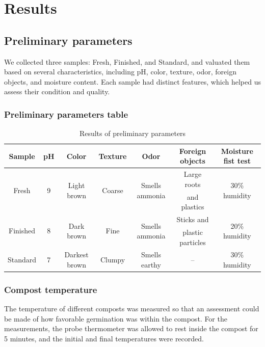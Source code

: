 \documentclass{article}
\begin{document}
\newpage
\section{Results}
\subsection{Preliminary parameters}
We collected three samples: Fresh, Finished, and Standard, and 
valuated them based on several characteristics, including pH, color,
texture, odor, foreign objects, and moisture content. Each sample had
distinct features, which helped us assess their condition and quality. 

\subsubsection{Preliminary parameters table}
\renewcommand{\arraystretch}{1.5}
\begin{table}[ht!]
    \centering \vspace{.3cm}
    \caption{Results of preliminary parameters}
    \hspace*{-.3cm}
    \begin{tabular}{|c|c|c|c|c|c|c|}
        \hline
        \textbf{Sample} & \textbf{pH} & \textbf{Color} & \textbf{Texture} & \textbf{Odor} & \textbf{Foreign objects} & \textbf{Moisture fist test}\\
        \hline
        \multirow{2}{*}{Fresh} & \multirow{2}{*}{9} & \multirow{2}{*}{Light brown} & \multirow{2}{*}{Coarse} & \multirow{2}{*}{Smells ammonia} & Large roots & \multirow{2}{*}{30\% humidity} \\
        & & & & & and plastics & \\
        \hline                                                                  
        \multirow{2}{*}{Finished} & \multirow{2}{*}{8} & \multirow{2}{*}{Dark brown} & \multirow{2}{*}{Fine} & \multirow{2}{*}{Smells ammonia} & Sticks and & \multirow{2}{*}{20\% humidity} \\
        & & & & & plastic particles & \\
        \hline
        Standard & 7 & Darkest brown & Clumpy & Smells earthy & -- & 30\% humidity\\
        \hline
    \end{tabular}
\end{table}
\phantom{} \vspace*{-.2cm}

\subsubsection{Compost temperature}
The temperature of different composts was measured so that an
assessment could be made of how favorable germination was within the
compost. For the measurements, the probe thermometer was allowed to
rest inside the compost for 5 minutes, and the initial and final
temperatures were recorded.
\end{document}
